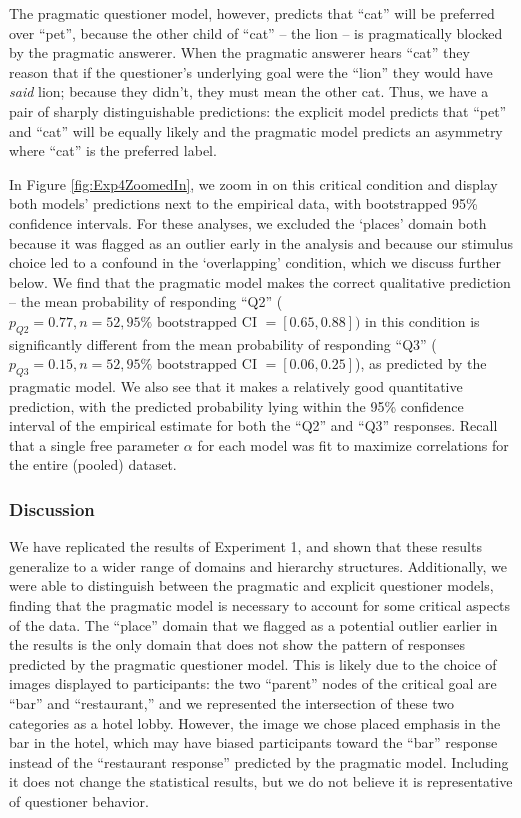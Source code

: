 \documentclass[12pt, floatsintext, jou]{apa6}
\begin{document}
The pragmatic questioner model, however, predicts that ``cat'' will be preferred over ``pet'', because the other child of ``cat'' -- the lion -- is pragmatically blocked by the pragmatic answerer. When the pragmatic answerer hears ``cat'' they reason that if the questioner's underlying goal were the ``lion'' they would have \emph{said} lion; because they didn't, they must mean the other cat. Thus, we have a pair of sharply distinguishable predictions: the explicit model predicts that ``pet'' and ``cat'' will be equally likely and the pragmatic model predicts an asymmetry where ``cat'' is the preferred label. 

In Figure \ref{fig:Exp4ZoomedIn}, we zoom in on this critical condition and display both models' predictions next to the empirical data, with bootstrapped 95\% confidence intervals. For these analyses, we excluded the `places' domain both because it was flagged as an outlier early in the analysis and because our stimulus choice led to a confound in the `overlapping' condition, which we discuss further below. We find that the pragmatic model makes the correct qualitative prediction -- the mean probability of responding ``Q2'' ($p_{Q2} = 0.77, n = 52, 95\%\textrm{ bootstrapped CI }= [0.65, 0.88])$ in this condition is significantly different from the mean probability of responding ``Q3'' ($p_{Q3} = 0.15, n = 52, 95\% \textrm{ bootstrapped CI }=[0.06, 0.25]$), as predicted by the pragmatic model. We also see that it makes a relatively good quantitative prediction, with the predicted probability lying within the 95\% confidence interval of the empirical estimate for both the ``Q2'' and ``Q3'' responses. Recall that a single free parameter $\alpha$ for each model was fit to maximize correlations for the entire (pooled) dataset. 


\subsubsection{Discussion}

We have replicated the results of Experiment 1, and shown that these results generalize to a wider range of domains and hierarchy structures. Additionally, we were able to distinguish between the pragmatic and explicit questioner models, finding that the pragmatic model is necessary to account for some critical aspects of the data. The ``place'' domain that we flagged as a potential outlier earlier in the results is the only domain that does not show the pattern of responses predicted by the pragmatic questioner model. This is likely due to the choice of images displayed to participants: the two ``parent'' nodes of the critical goal are ``bar'' and ``restaurant,'' and we represented the intersection of these two categories as a hotel lobby. However, the image we chose placed emphasis in the bar in the hotel, which may have biased participants toward the ``bar'' response instead of the ``restaurant response'' predicted by the pragmatic model. Including it does not change the statistical results, but we do not believe it is representative of questioner behavior. 
\end{document}
